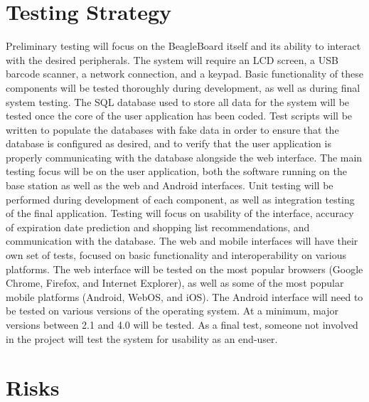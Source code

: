 \documentclass[11pt,letterpaper]{article}
\begin{document}
\section{Testing Strategy}
Preliminary testing will focus on the BeagleBoard itself and its ability to interact with the desired peripherals.  The system will require an LCD screen, a USB barcode scanner, a network connection, and a keypad.  Basic functionality of these components will be tested thoroughly during development, as well as during final system testing. 
\newline \quad \newline
The SQL database used to store all data for the system will be tested once the core of the user application has been coded.  Test scripts will be written to populate the databases with fake data in order to ensure that the database is configured as desired, and to verify that the user application is properly communicating with the database alongside the web interface.
\newline \quad \newline
The main testing focus will be on the user application, both the software running on the base station as well as the web and Android interfaces.  Unit testing will be performed during development of each component, as well as integration testing of the final application.  Testing will focus on usability of the interface, accuracy of expiration date prediction and shopping list recommendations, and communication with the database. 
\newline \quad \newline
The web and mobile interfaces will have their own set of tests, focused on basic functionality and interoperability on various platforms.  The web interface will be tested on the most popular browsers (Google Chrome, Firefox, and Internet Explorer), as well as some of the most popular mobile platforms (Android, WebOS, and iOS).  The Android interface will need to be tested on various versions of the operating system.  At a minimum, major versions between 2.1 and 4.0 will be tested.  
\newline \quad \newline
As a final test, someone not involved in the project will test the system for usability as an end-user.

\section{Risks}
\end{document}
